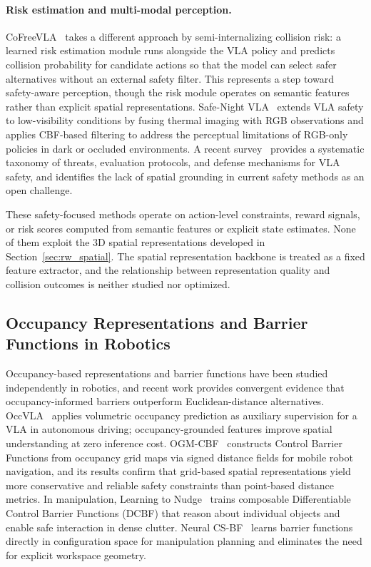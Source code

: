 \paragraph{Risk estimation and multi-modal perception.}
CoFreeVLA~\cite{chen2026cofreevla} takes a different approach by semi-internalizing collision risk: a learned risk estimation module runs alongside the VLA policy and predicts collision probability for candidate actions so that the model can select safer alternatives without an external safety filter. This represents a step toward safety-aware perception, though the risk module operates on semantic features rather than explicit spatial representations. Safe-Night VLA~\cite{safenightvla2026} extends VLA safety to low-visibility conditions by fusing thermal imaging with RGB observations and applies CBF-based filtering to address the perceptual limitations of RGB-only policies in dark or occluded environments. A recent survey~\cite{vlasafetysurvey2026} provides a systematic taxonomy of threats, evaluation protocols, and defense mechanisms for VLA safety, and identifies the lack of spatial grounding in current safety methods as an open challenge.

These safety-focused methods operate on action-level constraints, reward signals, or risk scores computed from semantic features or explicit state estimates. None of them exploit the 3D spatial representations developed in Section~\ref{sec:rw_spatial}. The spatial representation backbone is treated as a fixed feature extractor, and the relationship between representation quality and collision outcomes is neither studied nor optimized.

\subsection{Occupancy Representations and Barrier Functions in Robotics}
\label{sec:rw_occ}

Occupancy-based representations and barrier functions have been studied independently in robotics, and recent work provides convergent evidence that occupancy-informed barriers outperform Euclidean-distance alternatives. OccVLA~\cite{liu2025occvla} applies volumetric occupancy prediction as auxiliary supervision for a VLA in autonomous driving; occupancy-grounded features improve spatial understanding at zero inference cost. OGM-CBF~\cite{ji2024ogmcbf} constructs Control Barrier Functions from occupancy grid maps via signed distance fields for mobile robot navigation, and its results confirm that grid-based spatial representations yield more conservative and reliable safety constraints than point-based distance metrics. In manipulation, Learning to Nudge~\cite{kwon2026learningnudge} trains composable Differentiable Control Barrier Functions (DCBF) that reason about individual objects and enable safe interaction in dense clutter. Neural CS-BF~\cite{neuralcsbf2025} learns barrier functions directly in configuration space for manipulation planning and eliminates the need for explicit workspace geometry.

